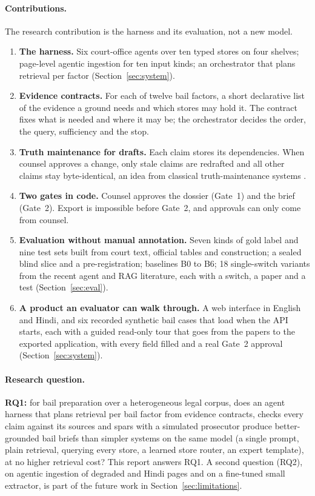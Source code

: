 \paragraph{Contributions.} The research contribution is the harness and its evaluation, not a new model.
\begin{enumerate}\setlength\itemsep{0pt}
\item \textbf{The harness.} Six court-office agents over ten typed stores on four shelves; page-level agentic ingestion for ten input kinds; an orchestrator that plans retrieval per factor (Section~\ref{sec:system}).
\item \textbf{Evidence contracts.} For each of twelve bail factors, a short declarative list of the evidence a ground needs and which stores may hold it. The contract fixes what is needed and where it may be; the orchestrator decides the order, the query, sufficiency and the stop.
\item \textbf{Truth maintenance for drafts.} Each claim stores its dependencies. When counsel approves a change, only stale claims are redrafted and all other claims stay byte-identical, an idea from classical truth-maintenance systems \citep{doyle1979tms}.
\item \textbf{Two gates in code.} Counsel approves the dossier (Gate~1) and the brief (Gate~2). Export is impossible before Gate~2, and approvals can only come from counsel.
\item \textbf{Evaluation without manual annotation.} Seven kinds of gold label and nine test sets built from court text, official tables and construction; a sealed blind slice and a pre-registration; baselines B0 to B6; 18 single-switch variants from the recent agent and RAG literature, each with a switch, a paper and a test (Section~\ref{sec:eval}).
\item \textbf{A product an evaluator can walk through.} A web interface in English and Hindi, and six recorded synthetic bail cases that load when the API starts, each with a guided read-only tour that goes from the papers to the exported application, with every field filled and a real Gate~2 approval (Section~\ref{sec:system}).
\end{enumerate}

\paragraph{Research question.} \textbf{RQ1:} for bail preparation over a heterogeneous legal corpus, does an agent harness that plans retrieval per bail factor from evidence contracts, checks every claim against its sources and spars with a simulated prosecutor produce better-grounded bail briefs than simpler systems on the same model (a single prompt, plain retrieval, querying every store, a learned store router, an expert template), at no higher retrieval cost? This report answers RQ1. A second question (RQ2), on agentic ingestion of degraded and Hindi pages and on a fine-tuned small extractor, is part of the future work in Section~\ref{sec:limitations}.


